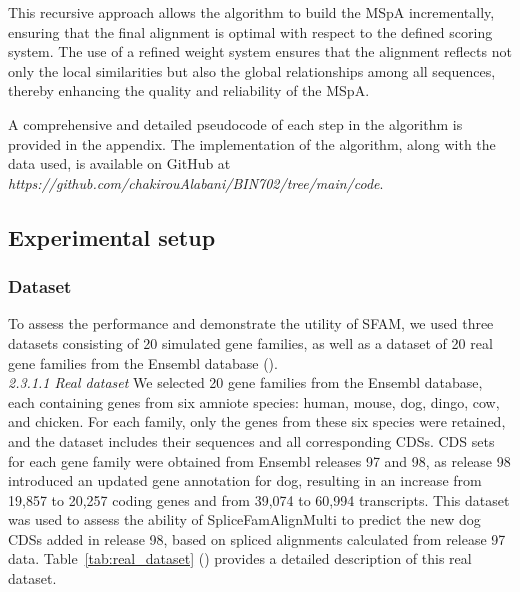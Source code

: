 \documentclass[12pt,oneside,letterpaper,english]{article}
\begin{document}
This recursive approach allows the algorithm to build the MSpA incrementally, ensuring that the final 
alignment is optimal with respect to the defined scoring system. The use of a refined weight system 
ensures that the alignment reflects not only the local similarities but also the global relationships 
among all sequences, thereby enhancing the quality and reliability of the MSpA.

A comprehensive and detailed pseudocode of each step in the algorithm is provided in the appendix. 
The implementation of the algorithm, along with the data used, is available on GitHub at 
\textit{https://github.com/chakirouAlabani/BIN702/tree/main/code}. 

\subsection{Experimental setup}
\subsubsection{Dataset}

To assess the performance and demonstrate the utility of SFAM, we used three datasets consisting of 
20 simulated gene families, as well as a dataset of 20 real gene families from the Ensembl 
database (\textit{\cite{zerbino2018ensembl}}). \\ 

\noindent \textit{2.3.1.1 Real dataset} We selected 20 gene families from the Ensembl database, each 
containing genes from six amniote species: human, mouse, dog, dingo, cow, and chicken. For each family, 
only the genes from these six species were retained, and the dataset includes their sequences and all 
corresponding CDSs. CDS sets for each gene family were obtained from Ensembl releases 97 and 98, as 
release 98 introduced an updated gene annotation for dog, resulting in an increase from 19,857 to 20,257 
coding genes and from 39,074 to 60,994 transcripts. This dataset was used to assess the ability of 
SpliceFamAlignMulti to predict the new dog CDSs added in release 98, based on spliced alignments 
calculated from release 97 data. Table~\ref{tab:real_dataset} (\textit{\cite{jammali2022pairwise}}) provides a detailed description of this real dataset. \\
\end{document}
